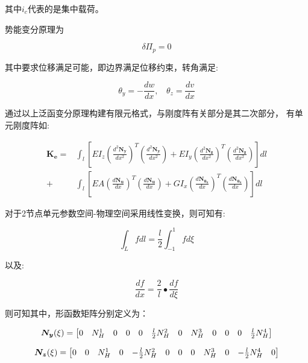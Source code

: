 \documentclass[UTF8,c5size]{ctexart}
\begin{document}
其中$i_c$代表的是集中载荷。

势能变分原理为

$$
\delta\Pi_p=0
$$

其中要求位移满足可能，即边界满足位移约束，转角满足:

\begin{equation}
    \theta_y=-\frac{dw}{dx},\ \ \ \ \theta_z=\frac{dv}{dx}
\end{equation}

通过以上泛函变分原理构建有限元格式，与刚度阵有关部分是其二次部分，
有单元刚度阵如:

\begin{equation}
    \begin{split}
    \bm{K_e} = &\int_{l}{\left[
        EI_z\left(\frac{d^2\bm{N_y}}{dx^2}\right)^T
        \left(\frac{d^2\bm{N_y}}{dx^2}\right)+
        EI_y\left(\frac{d^2\bm{N_z}}{dx^2}\right)^T
        \left(\frac{d^2\bm{N_z}}{dx^2}\right)
        \right]dl}\\+
    &\int_{l}{\left[
        EA\left(\frac{d\bm{N_{u}}}{dx}\right)^T
        \left(\frac{d\bm{N_{u}}}{dx}\right)+
        GI_x\left(\frac{d\bm{N_{\theta_x}}}{dx}\right)^T
        \left(\frac{d\bm{N_{\theta_x}}}{dx}\right)
    \right]dl}
    \end{split}
\end{equation}

对于2节点单元参数空间-物理空间采用线性变换，则可知有:


$$
\int_{L}{fdl}=\frac{l}{2}\int_{-1}^{1}{fd\xi}
$$


以及:

$$
\frac{df}{dx} = \frac{2}{l}\bullet\frac{df}{d\xi}
$$

则可知其中，形函数矩阵分别定义为：

\begin{equation}
    \bm{N_y}(\xi) = 
    \addtocounter{MaxMatrixCols}{40}
    \begin{bmatrix}
        0&N^1_H&0&0&0&\frac{l}{2}N^2_H&0&N^3_H&0&0&0&\frac{l}{2}N^4_H
    \end{bmatrix}
\end{equation}

\begin{equation}
    \bm{N_z}(\xi) = 
    \addtocounter{MaxMatrixCols}{40}
    \begin{bmatrix}
        0&0&N^1_H&0&-\frac{l}{2}N^2_H&0&0&0&N^3_H&0&-\frac{l}{2}N^4_H&0
    \end{bmatrix}
\end{equation}
\end{document}
